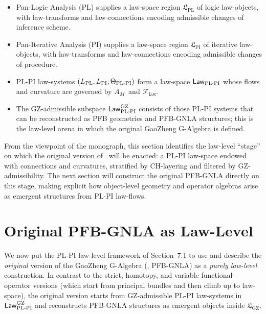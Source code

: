 \documentclass[11pt]{book}
\theoremstyle{plain}
\theoremstyle{definition}
\newcommand{\GZLS}{\ensuremath{\mathfrak{L}_{\mathrm{GZ}}}}       \newcommand{\GZLT}{\ensuremath{M_{!w}}}                           \newcommand{\GZLOC}{\ensuremath{A_M}}                             \newcommand{\GZLCurv}{\ensuremath{\mathcal{F}_{\mathrm{law}}}}
\begin{document}
\begin{itemize}
  \item Pan-Logic Analysis (PL) supplies a law-space region
        $\mathfrak{L}_{\mathrm{PL}}$ of logic law-objects, with
        law-transforms and law-connections encoding admissible changes
        of inference scheme.
  \item Pan-Iterative Analysis (PI) supplies a law-space region
        $\mathfrak{L}_{\mathrm{PI}}$ of iterative law-objects, with
        law-transforms and law-connections encoding admissible changes
        of procedure.
  \item PL-PI law-systems $(L_{\mathrm{PL}},L_{\mathrm{PI}};
        \Theta_{\mathrm{PL\text- PI}})$ form a law-space
        $\mathsf{Law}_{\mathrm{PL\text- PI}}$ whose flows and
        curvature are governed by \GZLOC\ and \GZLCurv.
  \item The GZ-admissible subspace
        $\mathsf{Law}_{\mathrm{PL\text- PI}}^{\mathrm{GZ}}$ consists of
        those PL-PI systems that can be reconstructed as PFB geometries
        and PFB-GNLA structures; this is the law-level arena in which
        the original GaoZheng G-Algebra is defined.
\end{itemize}

From the viewpoint of the monograph, this section identifies the
law-level “stage” on which the original version of \GAlgebra\ will be
enacted: a PL-PI law-space endowed with connections and curvatures,
stratified by CH-layering and filtered by GZ-admissibility. The next
section will construct the original PFB-GNLA directly on this stage,
making explicit how object-level geometry and operator algebras arise
as emergent structures from PL-PI law-flows.



\section{Original PFB-GNLA as Law-Level \GAlgebra}


We now put the PL-PI law-level framework of Section~7.1 to use and
describe the \emph{original} version of the GaoZheng G-Algebra
(\GAlgebra, PFB-GNLA) as a \emph{purely law-level} construction. In
contrast to the strict, homotopy, and variable functional--operator
versions (which start from principal bundles and then climb up to
law-space), the original version starts from GZ-admissible PL-PI
law-systems in $\mathsf{Law}_{\mathrm{PL\text- PI}}^{\mathrm{GZ}}$ and
reconstructs PFB-GNLA structures as emergent objects inside \GZLS.
\end{document}
